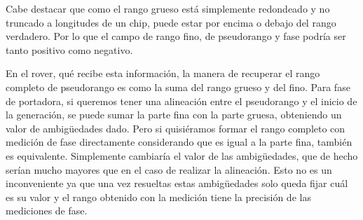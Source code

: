 \documentclass[a4paper,12pt,oneside,onecolumn,final,openright]{book}%
\begin{document}
	Cabe destacar que como el rango grueso está simplemente redondeado y no truncado a longitudes de un chip, puede estar por encima o debajo del rango verdadero. Por lo que el campo de rango fino, de pseudorango y fase podría ser tanto positivo como negativo.
	
	En el rover, qué recibe esta información, la manera de recuperar el rango completo de pseudorango es como la suma del rango grueso y del fino. Para fase de portadora, si queremos tener una alineación entre el pseudorango y el inicio de la generación, se puede sumar la parte fina con la parte gruesa, obteniendo un valor de ambigüedades dado. Pero si quisiéramos formar el rango completo con medición de fase directamente considerando que es igual a la parte fina, también es equivalente. Simplemente cambiaría el valor de las ambigüedades, que de hecho serían mucho mayores que en el caso de realizar la alineación. Esto no es un inconveniente ya que una vez resueltas estas ambigüedades solo queda fijar cuál es su valor y el rango obtenido con la medición tiene la precisión de las mediciones de fase.
\end{document}
